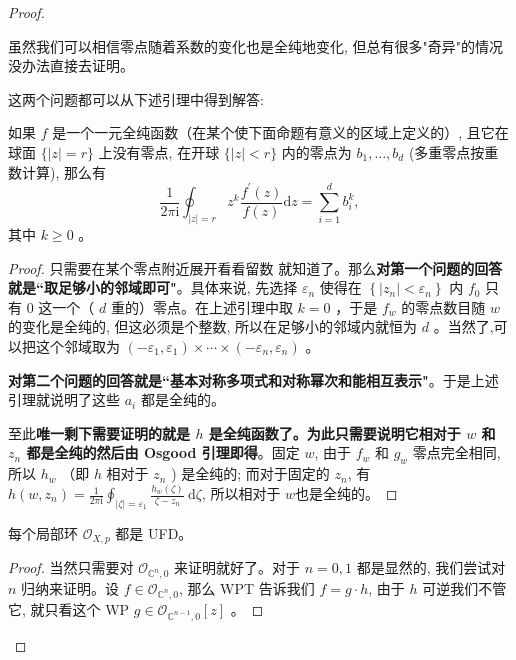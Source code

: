 \documentclass[lang=cn,12pt,a4paper,fontset=none]{beautybook}
\begin{document}
\begin{proof}
\begin{remark}
   虽然我们可以相信零点随着系数的变化也是全纯地变化, 但总有很多"奇异"的情况没办法直接去证明。
\end{remark}

这两个问题都可以从下述引理中得到解答:

\begin{lemma}
   如果 $f$ 是一个一元全纯函数（在某个使下面命题有意义的区域上定义的）, 且它在球面 $\{|z|=r\}$ 上没有零点, 在开球 $\{|z|<r\}$ 内的零点为 $b_1, \ldots, b_d$ (多重零点按重数计算), 那么有 
   $$\frac{1}{2 \pi \mathrm{i}} \oint_{|z|=r} z^k \frac{f^{\prime}(z)}{f(z)} \mathrm{d} z=\sum_{i=1}^d b_i^k,$$
   其中 $k \geq 0$ 。
\end{lemma}

\begin{proof}
   只需要在某个零点附近展开看看留数 就知道了。那么\textbf{对第一个问题的回答就是``取足够小的邻域即可"}。具体来说, 先选择 $\varepsilon_n$ 使得在 $\left\{\left|z_n\right|<\varepsilon_n\right\}$ 内 $f_0$ 只有 0 这一个（ $d$ 重的）零点。在上述引理中取 $k=0$ ，于是 $f_w$ 的零点数目随 $w$ 的变化是全纯的, 但这必须是个整数, 所以在足够小的邻域内就恒为 $d$ 。当然了,可以把这个邻域取为 $\left(-\varepsilon_1, \varepsilon_1\right) \times \cdots \times\left(-\varepsilon_n, \varepsilon_n\right)$ 。

\textbf{对第二个问题的回答就是``基本对称多项式和对称幂次和能相互表示"}。于是上述引理就说明了这些 $a_i$ 都是全纯的。

至此\textbf{唯一剩下需要证明的就是 $h$ 是全纯函数了。为此只需要说明它相对于 $w$ 和 $z_n$ 都是全纯的然后由 Osgood 引理即得}。固定 $w$, 由于 $f_w$ 和 $g_w$ 零点完全相同, 所以 $h_w$ （即 $h$ 相对于 $z_n$ ) 是全纯的; 而对于固定的 $z_n$, 有 $h\left(w, z_n\right)=\frac{1}{2 \pi \mathrm{i}} \oint_{|\zeta|=\varepsilon_1} \frac{h_w(\zeta)}{\zeta-z_n} \mathrm{~d} \zeta$, 所以相对于 $w$也是全纯的。
   
\end{proof}


\begin{corollary}
   每个局部环 $\mathcal{O}_{X, p}$ 都是 UFD。
\end{corollary}
\begin{proof}
当然只需要对 $\mathcal{O}_{\mathbb{C}^n, 0}$ 来证明就好了。对于 $n=0,1$ 都是显然的, 我们尝试对 $n$ 归纳来证明。设 $f \in \mathcal{O}_{\mathbb{C}^n, 0}$, 那么 WPT 告诉我们 $f=g \cdot h$, 由于 $h$ 可逆我们不管它, 就只看这个 WP $g \in \mathcal{O}_{\mathbb{C}^{n-1}, 0}[z]$ 。


\end{proof}
\end{proof}
\end{document}
